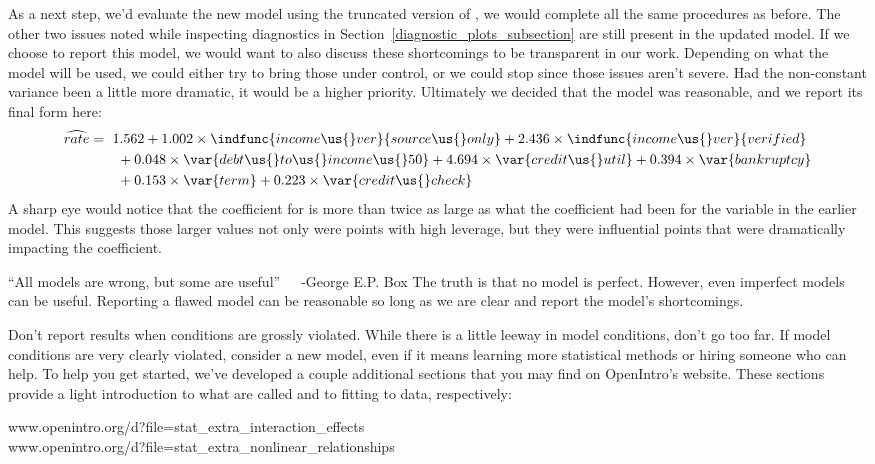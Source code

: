 As a next step, we'd evaluate the new model using
the truncated version of ,
we would complete all the same procedures as before.
The other two issues noted while inspecting diagnostics
in Section~\ref{diagnostic_plots_subsection} are still
present in the updated model.
If we choose to report this model, we would want to also
discuss these shortcomings to be transparent in our work.
Depending on what the model will be used, we could either
try to bring those under control, or we could stop since
those issues aren't severe.
Had the non-constant variance been a little more dramatic,
it would be a higher priority.
Ultimately we decided that the model was reasonable,
and we report its final form here:
\begin{align*}
\widehat{rate} &= \ 1.562
    + 1.002 \times \indfunc{income\us{}ver}{source\us{}only}
    + 2.436 \times \indfunc{income\us{}ver}{verified} \\
  &\qquad
    + 0.048 \times \var{debt\us{}to\us{}income\us{}50}
    + 4.694 \times \var{credit\us{}util}
    + 0.394 \times \var{bankruptcy} \\
  &\qquad
    + 0.153 \times \var{term}
    + 0.223 \times \var{credit\us{}check}
\end{align*}
A sharp eye would notice that the coefficient for
 is more than twice
as large as what the coefficient had been for the
 variable in the earlier model.
This suggests those larger values not only were points
with high leverage, but they were influential points that
were dramatically impacting the coefficient.

\begin{onebox}{``All models are wrong,
    but some are useful''~~~-George E.P. Box}
  The truth is that no model is perfect.
  However, even imperfect models can be useful.
  Reporting a flawed model can be reasonable so long
  as we are clear and report the model's shortcomings.
\end{onebox}

Don't report results when conditions are grossly violated.
While there is a little leeway in model conditions,
don't go too far.
If model conditions are very clearly violated,
consider a new model, even if it means learning more
statistical methods or hiring someone who can help.
To help you get started, we've developed a couple additional
sections that you may find on OpenIntro's website.
These sections provide a light introduction to what are
called 
and to fitting
%
to data, respectively:
\begin{center}
    {www.openintro.org/d?file=stat\_extra\_interaction\_effects}
  \\[3mm]
    {www.openintro.org/d?file=stat\_extra\_nonlinear\_relationships}
\end{center}

